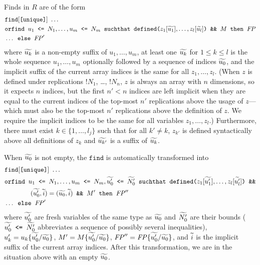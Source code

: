 \begin{itemize}
\begin{itemize}
Finds in $R$ are of the form
\[\begin{split}
&\texttt{find}[\texttt{[unique]}]\ \ldots\\
&\texttt{orfind }u_1 \texttt{ <= } N_1, \ldots, u_m \texttt{ <= }N_m
\texttt{ suchthat defined(}z_1[\widetilde{u_1}], \ldots, z_l[\widetilde{u_l}]\texttt{) \&\& }M\texttt{ then }\mathit{FP}\\
&\ldots \texttt{ else }\mathit{FP}'
\end{split}\]
where $\widetilde{u_k}$ is a non-empty
suffix of $u_1, \ldots, u_m$, at least one $\widetilde{u_k}$ for $1 \leq
k \leq l$ is the whole sequence $u_1, \ldots, u_m$ optionally followed by a sequence of indices $\widetilde{u_0}$,
and the implicit suffix of the current array indices is the same
for all $z_1, \ldots, z_l$.
%
(When $z$ is defined under replications $\texttt{!}N_1$, \ldots,
$\texttt{!}N_n$, $z$ is always an array with $n$ dimensions, so it
expects $n$ indices, but the first $n'<n$ indices are left implicit
when they are equal to the current indices of the top-most $n'$ replications
above the usage of $z$---which must also be the top-most $n'$
replications above the definition of $z$. We require the implicit
indices to be the same for all variables $z_1, \ldots, z_l$.)
Furthermore, there must exist $k \in \{ 1, \ldots, l_j\}$ such that
for all $k' \neq k$, $z_{k'}$ is defined syntactically above all
definitions of $z_k$ and $\widetilde{u_{k'}}$ is a suffix of $\widetilde{u_k}$.

When $\widetilde{u_0}$ is not empty, the $\texttt{find}$ is automatically
transformed into
\[\begin{split}
&\texttt{find}[\texttt{[unique]}]\ \ldots\\
&\texttt{orfind }u_1 \texttt{ <= } N_1, \ldots, u_m \texttt{ <= }N_m, \widetilde{u'_0}\texttt{ <= }\widetilde{N'_0}
\texttt{ suchthat defined(}z_1[\widetilde{u'_1}], \ldots, z_l[\widetilde{u'_l}]\texttt{) \&\&}\\
&\qquad\qquad (\widetilde{u'_0},\widetilde{i}) = (\widetilde{u_0},\widetilde{i})\texttt{ \&\& }M'\texttt{ then }\mathit{FP}''\\
&\ldots \texttt{ else }\mathit{FP}'
\end{split}\]
where $\widetilde{u'_0}$ are fresh variables of the same type as $\widetilde{u_0}$ and $\widetilde{N'_0}$ are their bounds
($\widetilde{u'_0}\texttt{ <= }\widetilde{N'_0}$ abbreviates a sequence of possibly several inequalities),
$u'_k = u_k \{\widetilde{u'_0}/\widetilde{u_0}\}$,
$M' = M\{\widetilde{u'_0}/\widetilde{u_0}\}$,
$\mathit{FP}'' = \mathit{FP}\{\widetilde{u'_0}/\widetilde{u_0}\}$,
and $\widetilde{i}$ is the implicit suffix of the current array indices.
After this transformation, we are in the situation above with an
empty $\widetilde{u_0}$.


\end{itemize}
\end{itemize}
